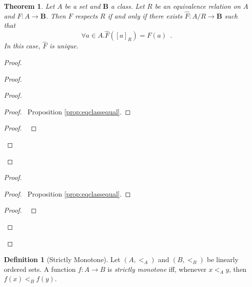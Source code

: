 \documentclass{book}
\let\qed\relax
\newtheorem{thm}[ax]{Theorem}
\theoremstyle{definition}
\newtheorem{df}[ax]{Definition}
\newcommand{\dom}{\ensuremath{\operatorname{dom}}}
\newcommand{\ran}{\ensuremath{\operatorname{ran}}}
\begin{document}
\begin{thm}
Let $A$ be a set and $\mathbf{B}$ a class. Let $R$ be an equivalence relation on $A$ and $F : A \rightarrow \mathbf{B}$. Then $F$ respects $R$ if and only if there exists $\hat{F} : A/R \rightarrow \mathbf{B}$ such that
\[ \forall a \in A. \hat{F}([a]_R) = F(a) \enspace . \]
In this case, $\hat{F}$ is unique.
\end{thm}

\begin{proof}
\pf
{}
\begin{proof}
	\begin{proof}
		\begin{proof}
			\pf\ Proposition \ref{prop:eqclassequal}.
		\end{proof}
		\begin{proof}
			\pf\ 
		\end{proof}
	\end{proof}
	\step{d}{$\dom \hat{F} = A / R$}
	\step{e}{$\ran \hat{F} \subseteq \mathbf{B}$}
\end{proof}
\begin{proof}
		\begin{proof}
			\pf\ Proposition \ref{prop:eqclassequal}.
		\end{proof}
	\begin{proof}
		\pf\ 
	\end{proof}
\end{proof}
\qed
\end{proof}

\begin{df}[Strictly Monotone]
Let $(A,<_A)$ and $(B, <_B)$ be linearly ordered sets. A function $f : A \rightarrow B$ is \emph{strictly monotone} iff, whenever $x <_A y$, then $f(x) <_B f(y)$.
\end{df}
\end{document}
